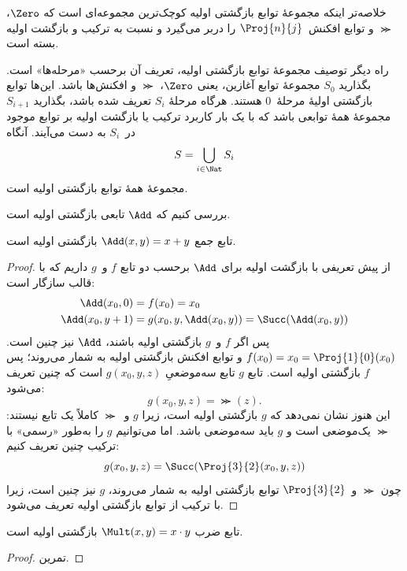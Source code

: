 \documentclass[../../../include/open-logic-section]{subfiles}
\begin{document}
\begin{explain}
خلاصه‌تر اینکه مجموعهٔ توابع بازگشتی اولیه کوچک‌ترین مجموعه‌ای است که
$\Zero$، $\Succ$ و توابع افکنش~$\Proj{n}{j}$ را دربر می‌گیرد و نسبت
به ترکیب و بازگشت اولیه بسته است.

راه دیگر توصیف مجموعهٔ توابع بازگشتی اولیه، تعریف آن برحسب «مرحله‌ها»
است. بگذارید $S_0$ مجموعهٔ توابع آغازین، یعنی $\Zero$، $\Succ$ و
افکنش‌ها باشد. این‌ها توابع بازگشتی اولیهٔ مرحلهٔ~$0$ هستند. هرگاه
مرحلهٔ $S_i$ تعریف شده باشد، بگذارید $S_{i+1}$ مجموعهٔ همهٔ توابعی
باشد که با یک بار کاربرد ترکیب یا بازگشت اولیه بر توابع موجود
در~$S_i$ به دست می‌آیند. آنگاه
\[
S = \bigcup_{i \in \Nat} S_i
\]
مجموعهٔ همهٔ توابع بازگشتی اولیه است.
\end{explain}

بررسی کنیم که $\Add$ تابعی بازگشتی اولیه است.

\begin{prop}
  تابع جمع $\Add(x,y)=x+y$ بازگشتی اولیه است.
\end{prop}

\begin{proof}
از پیش تعریفی با بازگشت اولیه برای $\Add$ برحسب دو تابع $f$ و~$g$
داریم که با قالب  سازگار است:
\begin{align*}
  \Add(x_0, 0) & = f(x_0) = x_0\\
  \Add(x_0, y+1) & = g(x_0, y, \Add(x_0, y)) =
  \Succ(\Add(x_0, y))
\end{align*}
پس اگر $f$ و~$g$ بازگشتی اولیه باشند، $\Add$ نیز چنین است.
$f(x_0)=x_0=\Proj{1}{0}(x_0)$ و توابع افکنش بازگشتی اولیه به شمار
می‌روند؛ پس $f$ بازگشتی اولیه است. تابع $g$ تابع سه‌موضعیِ
$g(x_0,y,z)$ است که چنین تعریف می‌شود:
\[
g(x_0, y, z) = \Succ(z).
\]
این هنوز نشان نمی‌دهد که $g$ بازگشتی اولیه است، زیرا $g$ و~$\Succ$
کاملاً یک تابع نیستند: $\Succ$ یک‌موضعی است و $g$ باید سه‌موضعی باشد.
اما می‌توانیم $g$ را به‌طور «رسمی» با ترکیب چنین تعریف کنیم:
\[
g(x_0, y, z) = \Succ(\Proj{3}{2}(x_0, y, z))
\]
چون $\Succ$ و~$\Proj{3}{2}$ توابع بازگشتی اولیه به شمار می‌روند،
$g$ نیز چنین است، زیرا با ترکیب از توابع بازگشتی اولیه تعریف می‌شود.
\end{proof}

\begin{prop}
  تابع ضرب $\Mult(x,y)=x\cdot y$ بازگشتی اولیه است.
\end{prop}

\begin{proof}
  تمرین.
\end{proof}
\end{document}
